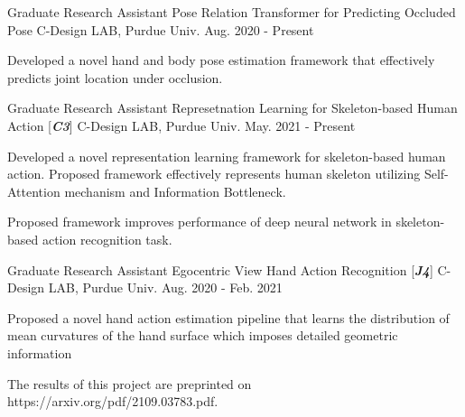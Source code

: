 

\begin{cventries}

\cventry
{Graduate Research Assistant} %
{Pose Relation Transformer for Predicting Occluded Pose} %
{C-Design LAB, Purdue Univ.} %
{Aug. 2020 - Present} %
{ %
\begin{cvitems}
\item {Developed a novel hand and body pose estimation framework that effectively predicts joint location under occlusion.}
\end{cvitems}
}


\cventry
{Graduate Research Assistant} %
{Represetnation Learning for Skeleton-based Human Action [\textit{\textbf{C3}}]} %
{C-Design LAB, Purdue Univ.} %
{May. 2021 - Present} %
{ %
\begin{cvitems}
\item {Developed a novel representation learning framework for skeleton-based human action. Proposed framework effectively represents human skeleton utilizing Self-Attention mechanism and Information Bottleneck.}
\item {Proposed framework improves performance of deep neural network in skeleton-based action recognition task.}
\end{cvitems}
}

\cventry
{Graduate Research Assistant} %
{Egocentric View Hand Action Recognition [\textit{\textbf{J4}}]} %
{C-Design LAB, Purdue Univ.} %
{Aug. 2020 - Feb. 2021} %
{ %
\begin{cvitems}
\item {Proposed a novel hand action estimation pipeline that learns the distribution of mean curvatures of the hand surface which imposes detailed geometric information}
\item {The results of this project are preprinted on https://arxiv.org/pdf/2109.03783.pdf.}
\end{cvitems}
}


\end{cventries}
